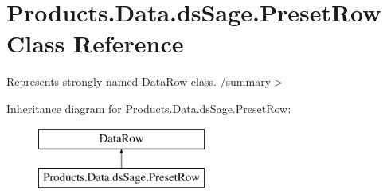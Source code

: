 \hypertarget{class_products_1_1_data_1_1ds_sage_1_1_preset_row}{}\section{Products.\+Data.\+ds\+Sage.\+Preset\+Row Class Reference}
\label{class_products_1_1_data_1_1ds_sage_1_1_preset_row}


Represents strongly named Data\+Row class. /summary$>$  


Inheritance diagram for Products.\+Data.\+ds\+Sage.\+Preset\+Row\+:\begin{figure}[H]
\begin{center}
\leavevmode
\includegraphics[height=2.000000cm]{class_products_1_1_data_1_1ds_sage_1_1_preset_row}
\end{center}
\end{figure}
